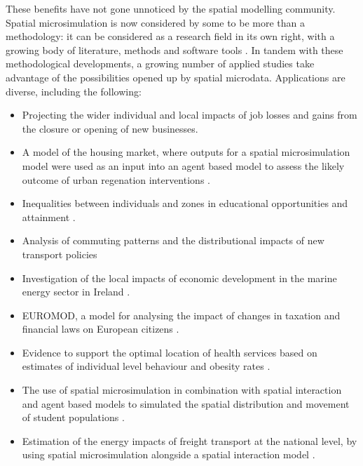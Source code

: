 \documentclass[a4paper,10pt]{article}
\begin{document}
These benefits have not gone unnoticed by the spatial modelling community.
Spatial microsimulation is now considered by some to be more than a methodology:
it can be considered as a research field in its
own right, with a growing body of literature, methods and software tools \citep{Tanton2013}.
In tandem with these methodological developments, a growing number of applied studies
take advantage of the possibilities opened up by spatial microdata.
Applications are diverse, including the following:
\begin{itemize}
 \item Projecting the wider individual and local impacts
of job losses and gains from the closure \citep{Ballas2006}
or opening \citep{VanLeeuwen2010} of new businesses.
\item A model of the housing market, where outputs
for a spatial microsimulation model were used as an input into
an agent based model to assess the likely outcome of urban regenation
interventions \citep{jordan2011agent}.
\item Inequalities between individuals and zones in educational opportunities
and attainment \citep{Kavroudakis2012}.
\item Analysis of commuting patterns and the distributional impacts
of new transport policies \citep{Lovelace2014-jtg}
\item Investigation of the local impacts of economic development
in the marine energy sector in Ireland \citep{Morrissey2013a}.
\item EUROMOD, a model for analysing the impact of changes
in taxation and financial laws on European citizens \citep{sutherland2013euromod}.
\item Evidence to support the optimal location of health services based
on estimates of individual level behaviour and obesity rates \citep{Tomintz2008,Clarke2010-valid}.
\item The use of spatial microsimulation in combination with
spatial interaction and agent based models to simulated the spatial
distribution and movement of student populations \citep{Wu2010}.
\item Estimation of the energy impacts of freight transport at the
national level, by using spatial microsimulation alongside
a spatial interaction model \citep{Zuo2013a}.
\end{itemize}
\end{document}
